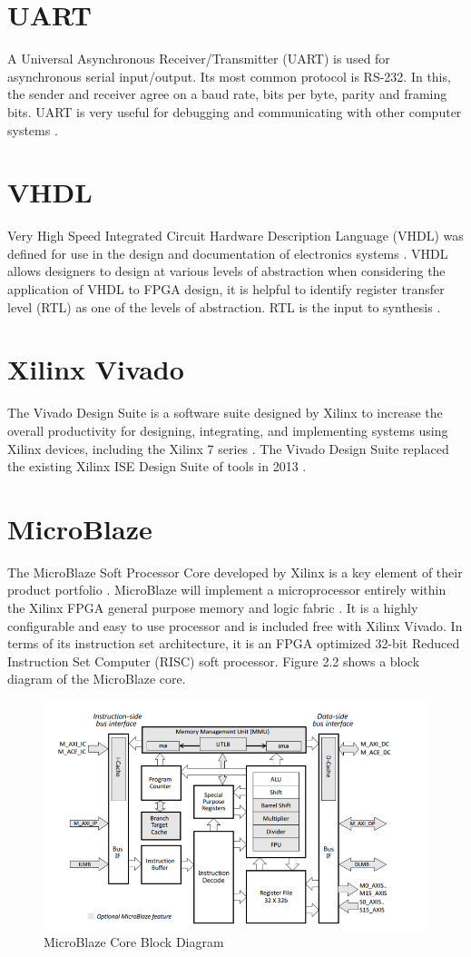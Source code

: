 \documentclass[12pt,a4paper]{report} %
\begin{document}
\section{UART}
A Universal Asynchronous Receiver/Transmitter (UART) is used for asynchronous serial input/output.
Its most common protocol is RS-232.
In this, the sender and receiver agree on a baud rate, bits per byte, parity and framing bits.
UART is very useful for debugging and communicating with other computer systems \cite{iot}.
\section{VHDL}
Very High Speed Integrated Circuit Hardware Description Language (VHDL) was defined for use in the design and documentation of electronics systems \cite{vhdl}.
VHDL allows designers to design at various levels of abstraction when considering the application of VHDL to FPGA design, it is helpful to identify register transfer level (RTL) as one of the levels of abstraction.
RTL is the input to synthesis \cite{vhdlabs}.
\section{Xilinx Vivado}
The Vivado Design Suite is a software suite designed by Xilinx to increase the overall productivity for designing, integrating, and implementing systems using Xilinx devices, including the Xilinx 7 series \cite{vivado}.
The Vivado Design Suite replaced the existing Xilinx ISE Design Suite of tools in 2013 \cite{ise}.
\section{MicroBlaze}
The MicroBlaze Soft Processor Core developed by Xilinx is a key element of their product portfolio \cite{microblaze}.
MicroBlaze will implement a microprocessor entirely within the Xilinx FPGA general purpose memory and logic fabric \cite{nexysmb}.
It is a highly configurable and easy to use processor and is included free with Xilinx Vivado.
In terms of its instruction set architecture, it is an FPGA optimized 32-bit Reduced Instruction Set Computer (RISC) soft processor.
Figure 2.2 shows a block diagram of the MicroBlaze core.
\begin{figure}[h]
\centerline{\includegraphics{diagrams/image5}}
\caption[MicroBlaze Core Block Diagram]{MicroBlaze Core Block Diagram \cite{microblock}}
\end{figure}
\end{document}
